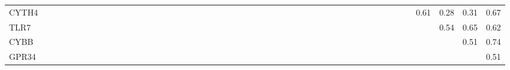\begin{longtable}{lrrrrrrrrrrrrrrrrrrrrrrrrrrrrrrrrrrrrrrrrrrrrrrrr}
CYTH4    &            &            &              &            &              &            &              &              &             &            &              &             &            &               &               &               &               &                &            &             &            &              &              &           &             &             &               &            &             &            &             &             &               &               &              &            &             &            &          &              &               &              &             &             &       0.61 &       0.28 &        0.31 &        0.67 \\
TLR7     &            &            &              &            &              &            &              &              &             &            &              &             &            &               &               &               &               &                &            &             &            &              &              &           &             &             &               &            &             &            &             &             &               &               &              &            &             &            &          &              &               &              &             &             &            &       0.54 &        0.65 &        0.62 \\
CYBB     &            &            &              &            &              &            &              &              &             &            &              &             &            &               &               &               &               &                &            &             &            &              &              &           &             &             &               &            &             &            &             &             &               &               &              &            &             &            &          &              &               &              &             &             &            &            &        0.51 &        0.74 \\
GPR34    &            &            &              &            &              &            &              &              &             &            &              &             &            &               &               &               &               &                &            &             &            &              &              &           &             &             &               &            &             &            &             &             &               &               &              &            &             &            &          &              &               &              &             &             &            &            &             &        0.51 \\
\end{longtable}


